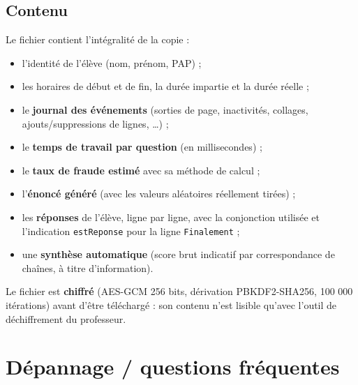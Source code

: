 \documentclass[11pt,a4paper]{article}
\begin{document}
\subsection{Contenu}

Le fichier contient l'intégralité de la copie :
\begin{itemize}
  \item l'identité de l'élève (nom, prénom, PAP) ;
  \item les horaires de début et de fin, la durée impartie et la durée
        réelle ;
  \item le \textbf{journal des événements} (sorties de page, inactivités,
        collages, ajouts/suppressions de lignes, \dots) ;
  \item le \textbf{temps de travail par question} (en millisecondes) ;
  \item le \textbf{taux de fraude estimé} avec sa méthode de calcul ;
  \item l'\textbf{énoncé généré} (avec les valeurs aléatoires réellement
        tirées) ;
  \item les \textbf{réponses} de l'élève, ligne par ligne, avec la
        conjonction utilisée et l'indication \texttt{estReponse} pour la ligne
        \texttt{Finalement} ;
  \item une \textbf{synthèse automatique} (score brut indicatif par
        correspondance de chaînes, à titre d'information).
\end{itemize}

Le fichier est \textbf{chiffré} (AES-GCM 256 bits, dérivation PBKDF2-SHA256,
100 000 itérations) avant d'être téléchargé : son contenu n'est lisible
qu'avec l'outil de déchiffrement du professeur.

\section{Dépannage / questions fréquentes}
\end{document}
